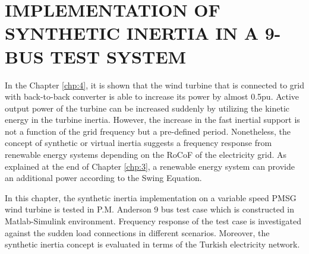 \chapter{IMPLEMENTATION OF SYNTHETIC INERTIA IN A 9-BUS TEST SYSTEM}
\label{chp:5}
In the Chapter \ref{chp:4}, it is shown that the wind turbine that is connected to grid with back-to-back converter is able to increase its power by almost 0.5pu. Active output power of the turbine can be increased suddenly by utilizing the kinetic energy in the turbine inertia. However, the increase in the fast inertial support is not a function of the grid frequency but a pre-defined period. Nonetheless, the concept of synthetic or virtual inertia suggests a frequency response from renewable energy systems depending on the RoCoF of the electricity grid. As explained at the end of Chapter \ref{chp:3}, a renewable energy system can provide an additional power according to the Swing Equation. \par
In this chapter, the synthetic inertia implementation on a variable speed PMSG wind turbine is tested in P.M. Anderson 9 bus test case which is constructed in Matlab-Simulink environment. Frequency response of the test case is investigated against the sudden load connections in different scenarios. Moreover, the synthetic inertia concept is evaluated in terms of the Turkish electricity network.
